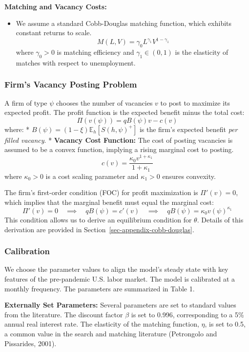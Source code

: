 \documentclass[
  11pt,
  letterpaper,
  DIV=11,
  numbers=noendperiod]{scrartcl}
\providecommand{\tightlist}{%
  \setlength{\itemsep}{0pt}\setlength{\parskip}{0pt}}\usepackage{longtable,booktabs,array}
\begin{document}
\textbf{Matching and Vacancy Costs:}

\begin{itemize}
\tightlist
\item
  We assume a standard Cobb-Douglas matching function, which exhibits
  constant returns to scale. \[
  M(L, V) = \gamma_{0} L^{\gamma_{1}} V^{1-\gamma_{1}}
  \] where \(\gamma_0 > 0\) is matching efficiency and
  \(\gamma_1 \in (0,1)\) is the elasticity of matches with respect to
  unemployment.
\end{itemize}

\subsubsection{Firm's Vacancy Posting
Problem}\label{firms-vacancy-posting-problem}

A firm of type \(\psi\) chooses the number of vacancies \(v\) to post to
maximize its expected profit. The profit function is the expected
benefit minus the total cost: \[
\Pi(v(\psi)) = q B(\psi)  v - c(v)
\] where: * \(B(\psi) = (1-\xi)\mathbb{E}_h[S(h,\psi)^{+}]\) is the
firm's expected benefit \emph{per filled vacancy}. * \textbf{Vacancy
Cost Function:} The cost of posting vacancies is assumed to be a convex
function, implying a rising marginal cost to posting.
\[c(v) = \frac{\kappa_{0} v^{1+\kappa_{1}}}{1+\kappa_{1}}\] where
\(\kappa_{0} > 0\) is a cost scaling parameter and \(\kappa_{1} > 0\)
ensures convexity.

The firm's first-order condition (FOC) for profit maximization is
\(\Pi'(v) = 0\), which implies that the marginal benefit must equal the
marginal cost: \[
\Pi'(v) = 0 \quad \implies \quad q B(\psi) = c'(v) \quad \implies \quad q B(\psi) = \kappa_{0} v(\psi)^{\kappa_{1}}
\] This condition allows us to derive an equilibrium condition for
\(\theta\). Details of this derivation are provided in
Section~\ref{sec-appendix-cobb-douglas}.

\subsubsection{Calibration}\label{calibration-1}

We choose the parameter values to align the model's steady state with
key features of the pre-pandemic U.S. labor market. The model is
calibrated at a monthly frequency. The parameters are summarized in
Table 1.

\textbf{Externally Set Parameters:} Several parameters are set to
standard values from the literature. The discount factor \(\beta\) is
set to 0.996, corresponding to a 5\% annual real interest rate. The
elasticity of the matching function, \(\eta\), is set to 0.5, a common
value in the search and matching literature (Petrongolo and Pissarides,
2001).
\end{document}
